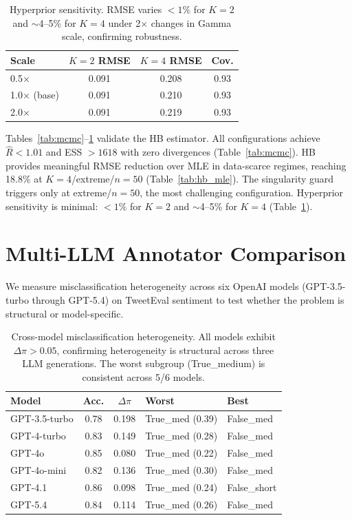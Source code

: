 \documentclass[11pt,twocolumn]{article}
\begin{document}
\begin{table}[t]
\centering
\caption{Hyperprior sensitivity. RMSE varies $<1\%$ for $K\!=\!2$ and $\sim$4--5\% for $K\!=\!4$ under 2$\times$ changes in Gamma scale, confirming robustness.}
\label{tab:hyperprior}
\small
\begin{tabular}{@{}lccc@{}}
\toprule
Scale & $K\!=\!2$ RMSE & $K\!=\!4$ RMSE & Cov. \\
\midrule
0.5$\times$ & 0.091 & 0.208 & 0.93 \\
1.0$\times$ (base) & 0.091 & 0.210 & 0.93 \\
2.0$\times$ & 0.091 & 0.219 & 0.93 \\
\bottomrule
\end{tabular}
\end{table}

Tables~\ref{tab:mcmc}--\ref{tab:hyperprior} validate the HB estimator. All configurations achieve $\hat{R} < 1.01$ and ESS $> 1618$ with zero divergences (Table~\ref{tab:mcmc}). HB provides meaningful RMSE reduction over MLE in data-scarce regimes, reaching 18.8\% at $K\!=\!4$/extreme/$n\!=\!50$ (Table~\ref{tab:hb_mle}). The singularity guard triggers only at extreme/$n\!=\!50$, the most challenging configuration. Hyperprior sensitivity is minimal: $<1\%$ for $K\!=\!2$ and $\sim$4--5\% for $K\!=\!4$ (Table~\ref{tab:hyperprior}).

\section{Multi-LLM Annotator Comparison}
\label{app:multi_llm}

We measure misclassification heterogeneity across six OpenAI models (GPT-3.5-turbo through GPT-5.4) on TweetEval sentiment to test whether the problem is structural or model-specific.

\begin{table}[t]
\centering
\caption{Cross-model misclassification heterogeneity. All models exhibit $\Delta\pi > 0.05$, confirming heterogeneity is structural across three LLM generations. The worst subgroup (True\_medium) is consistent across 5/6 models.}
\label{tab:multi_llm}
\small
\begin{tabular}{@{}lccll@{}}
\toprule
Model & Acc. & $\Delta\pi$ & Worst & Best \\
\midrule
GPT-3.5-turbo & 0.78 & 0.198 & True\_med (0.39) & False\_med \\
GPT-4-turbo & 0.83 & 0.149 & True\_med (0.28) & False\_med \\
GPT-4o & 0.85 & 0.080 & True\_med (0.22) & False\_med \\
GPT-4o-mini & 0.82 & 0.136 & True\_med (0.30) & False\_med \\
GPT-4.1 & 0.86 & 0.098 & True\_med (0.24) & False\_short \\
GPT-5.4 & 0.84 & 0.114 & True\_med (0.26) & False\_med \\
\bottomrule
\end{tabular}
\end{table}
\end{document}
